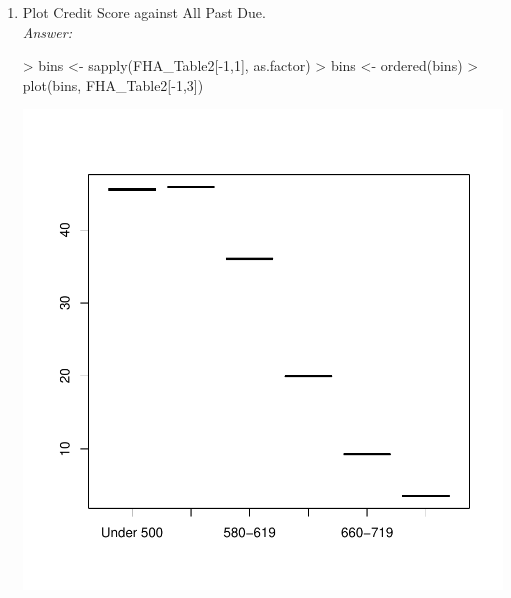 \documentclass{article}
\begin{document}
\begin{enumerate}
\begin{enumerate}
\begin{enumerate}
				\item Plot Credit Score against All Past Due.\\
				\emph{Answer:}
					\begin{center}
\begin{Schunk}
\begin{Sinput}
> bins <- sapply(FHA_Table2[-1,1], as.factor)
> bins <- ordered(bins)
> plot(bins, FHA_Table2[-1,3])
\end{Sinput}
\end{Schunk}
\includegraphics{debseal_HW2-010}
					\end{center}			
			\end{enumerate}				
		\end{enumerate}		
		

\end{enumerate}
\end{document}
